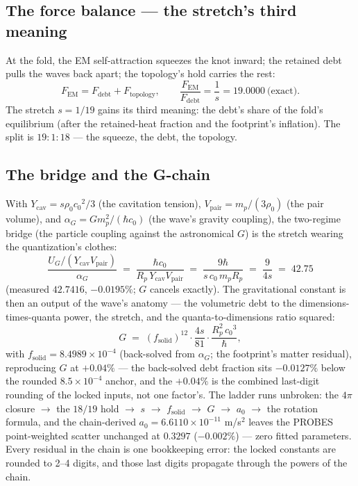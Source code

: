\documentclass[11pt, a4paper]{article}
\newcommand{\cnot}{\ensuremath{c_0}}
\newcommand{\rhonot}{\ensuremath{\rho_0}}
\begin{document}
\subsection{The force balance --- the stretch's third meaning}
At the fold, the EM self-attraction squeezes the knot inward; the retained debt
pulls the waves back apart; the topology's hold carries the rest:
\begin{equation}
F_{\mathrm{EM}} = F_{\mathrm{debt}} + F_{\mathrm{topology}},
\qquad
\frac{F_{\mathrm{EM}}}{F_{\mathrm{debt}}} = \frac{1}{s} = 19.0000 \ \text{(exact)}.
\end{equation}
The stretch $s = 1/19$ gains its third meaning: the debt's share of the fold's
equilibrium (after the retained-heat fraction and the footprint's inflation).
The split is $19:1:18$ --- the squeeze, the debt, the topology.

\subsection{The bridge and the G-chain}
With $Y_{\mathrm{cav}} = s\rhonot\cnot^2/3$ (the cavitation tension),
$V_{\mathrm{pair}} = m_p/(3\rhonot)$ (the pair volume), and
$\alpha_G = G m_p^2/(\hbar\cnot)$ (the wave's gravity coupling), the two-regime
bridge (the particle coupling against the astronomical $G$) is
the stretch wearing the quantization's clothes:
\begin{equation}
\frac{U_G/(Y_{\mathrm{cav}}V_{\mathrm{pair}})}{\alpha_G}
\;=\; \frac{\hbar\cnot}{R_p\,Y_{\mathrm{cav}}V_{\mathrm{pair}}}
\;=\; \frac{9\hbar}{s\,\cnot\,m_p R_p}
\;=\; \frac{9}{4s} \;=\; 42.75
\end{equation}
(measured $42.7416$, $-0.0195\%$; $G$ cancels exactly).
The gravitational constant is then an output of the wave's anatomy --- the
volumetric debt to the dimensions-times-quanta power, the stretch, and the
quanta-to-dimensions ratio squared:
\begin{equation}
G \;=\; (f_{\mathrm{solid}})^{12}\cdot\frac{4s}{81}\cdot
\frac{R_p^2\,\cnot^3}{\hbar},
\end{equation}
with $f_{\mathrm{solid}} = 8.4989\times10^{-4}$ (back-solved from
$\alpha_G$; the footprint's matter residual), reproducing $G$ at $+0.04\%$ ---
the back-solved debt fraction sits $-0.0127\%$ below the rounded $8.5\times10^{-4}$
anchor, and the $+0.04\%$ is the combined last-digit rounding of the locked
inputs, not one factor's. The ladder runs
unbroken: the $4\pi$ closure
$\to$ the $18/19$ hold $\to$ $s$ $\to$ $f_{\mathrm{solid}}$ $\to$ $G$ $\to$
$a_0$ $\to$ the rotation formula, and the chain-derived
$a_0 = 6.6110\times10^{-11}$ m/s$^2$ leaves the PROBES point-weighted scatter
unchanged at $0.3297$ ($-0.002\%$) --- zero fitted parameters. Every residual in
the chain is one bookkeeping error: the locked constants are rounded to 2--4
digits, and those last digits propagate through the powers of the chain.
\end{document}
